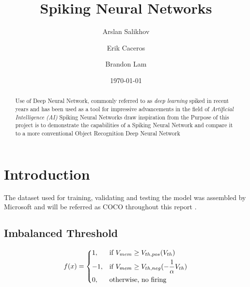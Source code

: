 \documentclass{article}
\title{Spiking Neural Networks}
\author{Arslan Salikhov \\
	\and 
	Erik Caceros \\
	\and
	Brandon Lam \\
	}
\date{\today}
\begin{document}
\begin{titlingpage}
\maketitle
\end{titlingpage}


\tableofcontents
\newpage


\begin{abstract}
Use of Deep Neural Network, commonly referred to as
\emph{deep learning} spiked in recent years and has been used
as a tool for impressive advancements in the field of 
\emph{Artificial Intelligence (AI)}
Spiking Neural Networks draw inspiration from the 
Purpose of this project is to demonstrate the capabilities of a 
Spiking Neural Network and compare it to a more conventional 
Object Recognition Deep Neural Network
\end{abstract}

\section{Introduction}

The dataset used for training, validating and testing the 
model was assembled by Microsoft and will be referred as
COCO throughout this report . 
  
\subsection{Imbalanced Threshold} 
\[
    f(x)= 
\begin{dcases}
    1 ,& \text{if } {V_{mem}}\geq V_{th,pos}(V_{th})\\
	-1 ,& \text{if } {V_{mem}}\geq V_{th,neg}(-\frac{1}{\alpha}V_{th})\\
    0,              & \text{otherwise, no firing}
\end{dcases}
\]

\newpage


\end{document}
